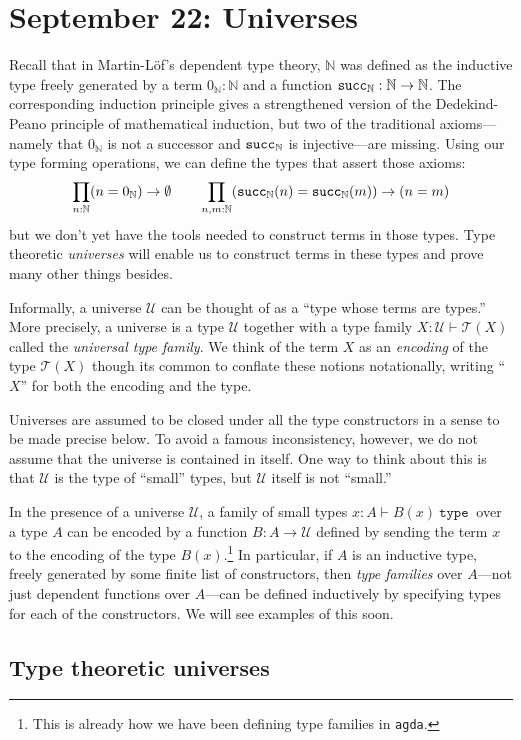 \documentclass{amsart}
\theoremstyle{theorem}
\theoremstyle{definition}
\theoremstyle{remark}
\newcommand{\0}{\mathbbe{0}}
\newcommand{\1}{\mathbbe{1}}
\newcommand{\2}{\mathbbe{2}}
\newcommand{\3}{\mathbbe{3}}
\newcommand{\4}{\mathbbe{4}}
\newcommand{\univ}{{~\texttt{type}~}}
\newcommand{\term}[1]{{\textup{\texttt{#1}}}}
\newcommand{\bN}{{\mathbb{N}}}
\newcommand{\suc}{\term{succ}_{\bN}}
\newcommand{\UU}{{\mathcal{U}}}
\newcommand{\sT}{\mathcal{T}}
\begin{document}
\section*{September 22: Universes}

Recall that in Martin-L\"{o}f's dependent type theory, $\bN$ was defined as the inductive type freely generated by a term $0_\bN : \bN$ and a function $\suc :\bN \to \bN$. The corresponding induction principle gives a strengthened version of the Dedekind-Peano principle of mathematical induction, but two of the traditional axioms---namely that $0_\bN$ is not a successor and $\suc$ is injective---are missing. Using our type forming operations, we can define the types that assert those axioms:
\[ \prod_{n : \bN} (n = 0_\bN) \to \emptyset \qquad \prod_{n,m : \bN} (\suc(n) = \suc(m)) \to (n = m)\]
but we don't yet have the tools needed to construct terms in those types. Type theoretic \emph{universes} will enable us to construct terms in these types and prove many other things besides.

Informally, a universe $\UU$ can be thought of as a ``type whose terms are types.'' More precisely, a universe is a type $\UU$ together with a type family $X : \UU \vdash \sT(X)$ called the \emph{universal type family}. We think of the term $X$ as an \emph{encoding} of the type $\sT(X)$ though its common to conflate these notions notationally, writing ``$X$'' for both the encoding and the type.

Universes are assumed to be closed under all the type constructors in a sense to be made precise below. To avoid a famous inconsistency, however, we do not assume that the universe is contained in itself. One way to think about this is that $\UU$ is the type of ``small'' types, but $\UU$ itself is not ``small.''

In the presence of a universe $\UU$, a family of small types $x : A \vdash B(x) \univ$ over a type $A$ can be encoded by a function $B \colon A \to \UU$ defined by sending the term $x$ to the encoding of the type $B(x)$.\footnote{This is already how we have been defining type families in \texttt{agda}.} In particular, if $A$ is an inductive type, freely generated by some finite list of constructors, then \emph{type families} over $A$---not just dependent functions over $A$---can be defined inductively by specifying types for each of the constructors. We will see examples of this soon.

\subsection*{Type theoretic universes}
\end{document}
